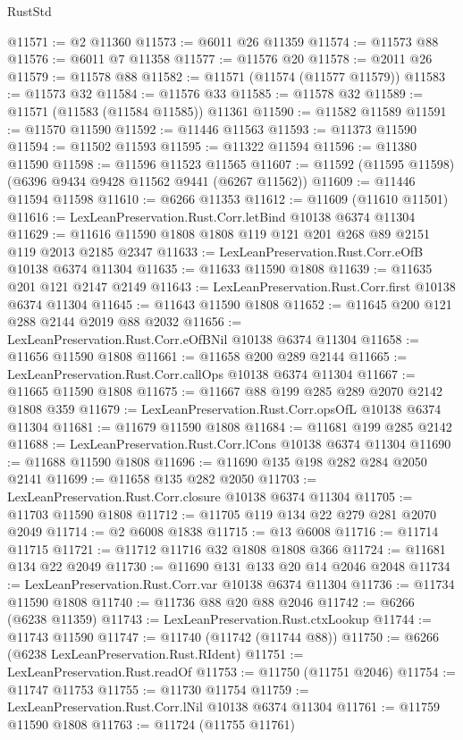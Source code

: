 \begin{lexlean}{RustStd}
\begin{coremodule}
@11571 := @2 @11360
@11573 := @6011 @26 @11359
@11574 := @11573 @88
@11576 := @6011 @7 @11358
@11577 := @11576 @20
@11578 := @2011 @26
@11579 := @11578 @88
@11582 := @11571 (@11574 (@11577 @11579))
@11583 := @11573 @32
@11584 := @11576 @33
@11585 := @11578 @32
@11589 := @11571 (@11583 (@11584 @11585)) @11361
@11590 := @11582 @11589
@11591 := @11570 @11590
@11592 := @11446 @11563
@11593 := @11373 @11590
@11594 := @11502 @11593
@11595 := @11322 @11594
@11596 := @11380 @11590
@11598 := @11596 @11523 @11565
@11607 := @11592 (@11595 @11598) (@6396 @9434 @9428 @11562 @9441 (@6267 @11562))
@11609 := @11446 @11594 @11598
@11610 := @6266 @11353
@11612 := @11609 (@11610 @11501)
@11616 := LexLeanPreservation.Rust.Corr.letBind @10138 @6374 @11304
@11629 := @11616 @11590 @1808 @1808 @119 @121 @201 @268 @89 @2151 @119 @2013 @2185 @2347
@11633 := LexLeanPreservation.Rust.Corr.eOfB @10138 @6374 @11304
@11635 := @11633 @11590 @1808
@11639 := @11635 @201 @121 @2147 @2149
@11643 := LexLeanPreservation.Rust.Corr.first @10138 @6374 @11304
@11645 := @11643 @11590 @1808
@11652 := @11645 @200 @121 @288 @2144 @2019 @88 @2032
@11656 := LexLeanPreservation.Rust.Corr.eOfBNil @10138 @6374 @11304
@11658 := @11656 @11590 @1808
@11661 := @11658 @200 @289 @2144
@11665 := LexLeanPreservation.Rust.Corr.callOps @10138 @6374 @11304
@11667 := @11665 @11590 @1808
@11675 := @11667 @88 @199 @285 @289 @2070 @2142 @1808 @359
@11679 := LexLeanPreservation.Rust.Corr.opsOfL @10138 @6374 @11304
@11681 := @11679 @11590 @1808
@11684 := @11681 @199 @285 @2142
@11688 := LexLeanPreservation.Rust.Corr.lCons @10138 @6374 @11304
@11690 := @11688 @11590 @1808
@11696 := @11690 @135 @198 @282 @284 @2050 @2141
@11699 := @11658 @135 @282 @2050
@11703 := LexLeanPreservation.Rust.Corr.closure @10138 @6374 @11304
@11705 := @11703 @11590 @1808
@11712 := @11705 @119 @134 @22 @279 @281 @2070 @2049
@11714 := @2 @6008 @1838
@11715 := @13 @6008
@11716 := @11714 @11715
@11721 := @11712 @11716 @32 @1808 @1808 @366
@11724 := @11681 @134 @22 @2049
@11730 := @11690 @131 @133 @20 @14 @2046 @2048
@11734 := LexLeanPreservation.Rust.Corr.var @10138 @6374 @11304
@11736 := @11734 @11590 @1808
@11740 := @11736 @88 @20 @88 @2046
@11742 := @6266 (@6238 @11359)
@11743 := LexLeanPreservation.Rust.ctxLookup
@11744 := @11743 @11590
@11747 := @11740 (@11742 (@11744 @88))
@11750 := @6266 (@6238 LexLeanPreservation.Rust.RIdent)
@11751 := LexLeanPreservation.Rust.readOf
@11753 := @11750 (@11751 @2046)
@11754 := @11747 @11753
@11755 := @11730 @11754
@11759 := LexLeanPreservation.Rust.Corr.lNil @10138 @6374 @11304
@11761 := @11759 @11590 @1808
@11763 := @11724 (@11755 @11761)

\end{coremodule}
\end{lexlean}

